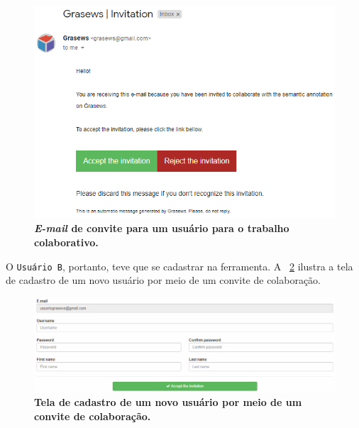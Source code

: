     \begin{figure}[h]
            \includegraphics[scale=1.5]{5-grasews-estudo-de-caso/imagens/estudo-de-caso-email-convite.png}
        \centering
        \caption[\textit{E-mail} de convite para um usuário para o trabalho colaborativo]{\textbf{\textit{E-mail} de convite para um usuário para o trabalho colaborativo.}}
        \label{fig:estudo-de-caso-email-convite}
    \end{figure}

O \texttt{Usuário B}, portanto, teve que se cadastrar na ferramenta. A \figurename~\ref{fig:estudo-de-caso-criar-novo-usuario-por-convite} ilustra a tela de cadastro de um novo usuário por meio de um convite de colaboração.

    \begin{figure}[h]
            \includegraphics[scale=1.5]{5-grasews-estudo-de-caso/imagens/estudo-de-caso-criar-novo-usuario-por-convite.png}
        \centering
        \caption[Tela de cadastro de um novo usuário por meio de um convite de colaboração]{\textbf{Tela de cadastro de um novo usuário por meio de um convite de colaboração.}}
        \label{fig:estudo-de-caso-criar-novo-usuario-por-convite}
    \end{figure}

